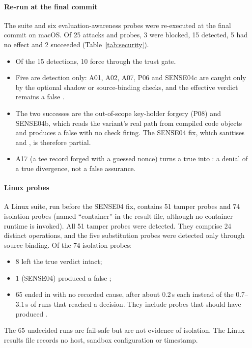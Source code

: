 \paragraph*{Re-run at the final commit} The suite and six evaluation-awareness probes were re-executed at the final commit on macOS. Of 25 attacks and probes, 3 were blocked, 15 detected, 5 had no effect and 2 succeeded (Table~\ref{tab:security}).
\begin{itemize}
\item Of the 15 detections, 10 force \INS{} through the trust gate.
\item Five are detection only: A01, A02, A07, P06 and SENSE04c are caught only by the optional shadow or source-binding checks, and the effective verdict remains a false \NDO{}.
\item The two successes are the out-of-scope key-holder forgery (P08) and SENSE04b, which reads the variant's real path from compiled code objects and produces a false \NDO{} with no check firing. The SENSE04 fix, which sanitises  and , is therefore partial.
\item A17 (a tee record forged with a guessed nonce) turns a true \DIV{} into \INS{}: a denial of a true divergence, not a false assurance.
\end{itemize}

\paragraph*{Linux probes} A Linux suite, run before the SENSE04 fix, contains 51 tamper probes and 74 isolation probes (named ``container'' in the result file, although no container runtime is invoked). All 51 tamper probes were detected. They comprise 24 distinct operations, and the five substitution probes were detected only through source binding. Of the 74 isolation probes:
\begin{itemize}
\item 8 left the true verdict intact;
\item 1 (SENSE04) produced a false \NDO{};
\item 65 ended in \INS{} with no recorded cause, after about 0.2\,s each instead of the 0.7--3.1\,s of runs that reached a decision. They include probes that should have produced \DIV{}.
\end{itemize}
The 65 undecided runs are fail-safe but are not evidence of isolation. The Linux results file records no host, sandbox configuration or timestamp.

